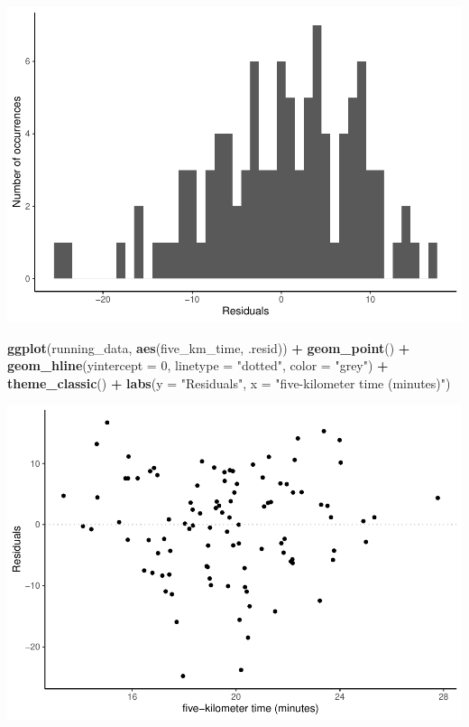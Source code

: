\documentclass[
]{book}
\newenvironment{Shaded}{\begin{snugshade}}{\end{snugshade}}
\newcommand{\DataTypeTok}[1]{\textcolor[rgb]{0.13,0.29,0.53}{#1}}
\newcommand{\DecValTok}[1]{\textcolor[rgb]{0.00,0.00,0.81}{#1}}
\newcommand{\KeywordTok}[1]{\textcolor[rgb]{0.13,0.29,0.53}{\textbf{#1}}}
\newcommand{\NormalTok}[1]{#1}
\newcommand{\OperatorTok}[1]{\textcolor[rgb]{0.81,0.36,0.00}{\textbf{#1}}}
\newcommand{\StringTok}[1]{\textcolor[rgb]{0.31,0.60,0.02}{#1}}
\begin{document}
\includegraphics{telling_stories_with_data_files/figure-latex/unnamed-chunk-357-1.pdf}

\begin{Shaded}
\begin{Highlighting}[]
\KeywordTok{ggplot}\NormalTok{(running_data, }\KeywordTok{aes}\NormalTok{(five_km_time, .resid)) }\OperatorTok{+}\StringTok{ }
\StringTok{  }\KeywordTok{geom_point}\NormalTok{() }\OperatorTok{+}
\StringTok{  }\KeywordTok{geom_hline}\NormalTok{(}\DataTypeTok{yintercept =} \DecValTok{0}\NormalTok{, }\DataTypeTok{linetype =} \StringTok{"dotted"}\NormalTok{, }\DataTypeTok{color =} \StringTok{"grey"}\NormalTok{) }\OperatorTok{+}
\StringTok{  }\KeywordTok{theme_classic}\NormalTok{() }\OperatorTok{+}
\StringTok{  }\KeywordTok{labs}\NormalTok{(}\DataTypeTok{y =} \StringTok{"Residuals"}\NormalTok{,}
       \DataTypeTok{x =} \StringTok{"five-kilometer time (minutes)"}\NormalTok{)}
\end{Highlighting}
\end{Shaded}

\includegraphics{telling_stories_with_data_files/figure-latex/unnamed-chunk-357-2.pdf}
\end{document}
